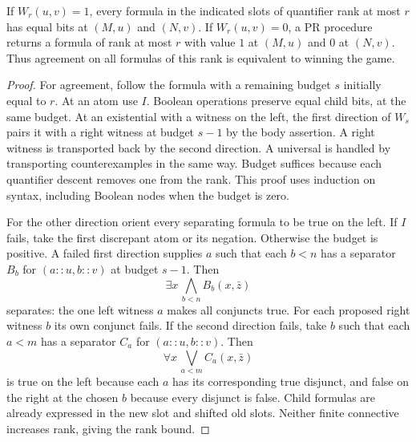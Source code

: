 \begin{theorem}\label{thm:ef}
If $W_r(u,v)=1$, every formula in the indicated slots of quantifier rank at most $r$ has equal bits at $(M,u)$ and $(N,v)$. If $W_r(u,v)=0$, a PR procedure returns a formula of rank at most $r$ with value $1$ at $(M,u)$ and $0$ at $(N,v)$. Thus agreement on all formulas of this rank is equivalent to winning the game.
\end{theorem}
\begin{proof}
For agreement, follow the formula with a remaining budget $s$ initially equal to $r$. At an atom use $I$. Boolean operations preserve equal child bits, at the same budget. At an existential with a witness on the left, the first direction of $W_s$ pairs it with a right witness at budget $s-1$ by the body assertion. A right witness is transported back by the second direction. A universal is handled by transporting counterexamples in the same way. Budget suffices because each quantifier descent removes one from the rank. This proof uses induction on syntax, including Boolean nodes when the budget is zero.

For the other direction orient every separating formula to be true on the left. If $I$ fails, take the first discrepant atom or its negation. Otherwise the budget is positive. A failed first direction supplies $a$ such that each $b<n$ has a separator $B_b$ for $(a::u,b::v)$ at budget $s-1$. Then
\[
                  \exists x\,\bigwedge_{b<n} B_b(x,\bar z)
\]
separates: the one left witness $a$ makes all conjuncts true. For each proposed right witness $b$ its own conjunct fails. If the second direction fails, take $b$ such that each $a<m$ has a separator $C_a$ for $(a::u,b::v)$. Then
\[
                  \forall x\,\bigvee_{a<m} C_a(x,\bar z)
\]
is true on the left because each $a$ has its corresponding true disjunct, and false on the right at the chosen $b$ because every disjunct is false. Child formulas are already expressed in the new slot and shifted old slots. Neither finite connective increases rank, giving the rank bound.


\end{proof}
